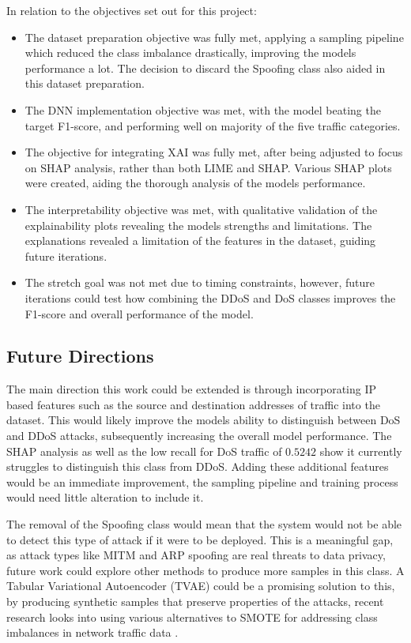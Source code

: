 \documentclass[11pt,a4paper]{article}
\begin{document}
In relation to the objectives set out for this project:
\begin{itemize}
    \item The dataset preparation objective was fully met, applying a sampling pipeline which reduced the class imbalance drastically, improving the models performance a lot. The decision to discard the Spoofing class also aided in this dataset preparation.
    \item The DNN implementation objective was met, with the model beating the target F1-score, and performing well on majority of the five traffic categories.
    \item The objective for integrating XAI was fully met, after being adjusted to focus on SHAP analysis, rather than both LIME and SHAP. Various SHAP plots were created, aiding the thorough analysis of the models performance.
    \item The interpretability objective was met, with qualitative validation of the explainability plots revealing the models strengths and limitations. The explanations revealed a limitation of the features in the dataset, guiding future iterations.
    \item The stretch goal was not met due to timing constraints, however, future iterations could test how combining the DDoS and DoS classes improves the F1-score and overall performance of the model.
\end{itemize}
\subsection{Future Directions}
The main direction this work could be extended is through incorporating IP based features such as the source and destination addresses of traffic into the dataset. This would likely improve the models ability to distinguish between DoS and DDoS attacks, subsequently increasing the overall model performance. The SHAP analysis as well as the low recall for DoS traffic of $0.5242$ show it currently struggles to distinguish this class from DDoS. Adding these additional features would be an immediate improvement, the sampling pipeline and training process would need little alteration to include it.

The removal of the Spoofing class would mean that the system would not be able to detect this type of attack if it were to be deployed. This is a meaningful gap, as attack types like MITM and ARP spoofing are real threats to data privacy, future work could explore other methods to produce more samples in this class. A Tabular Variational Autoencoder (TVAE) could be a promising solution to this, by producing synthetic samples that preserve properties of the attacks, recent research looks into using various alternatives to SMOTE for addressing class imbalances in network traffic data \cite{fi17120561}.
\end{document}
